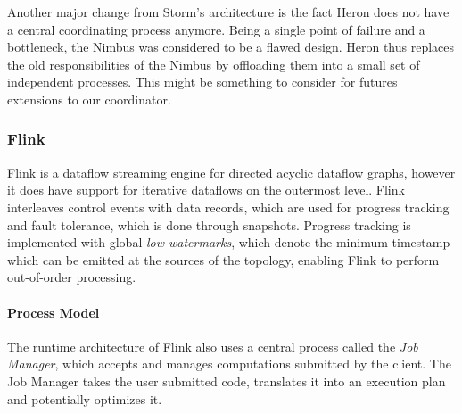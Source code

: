 Another major change from Storm's architecture
is the fact Heron does not have a central coordinating process anymore. Being
a single point of failure and a bottleneck, the Nimbus was considered to be a
flawed design. Heron thus replaces the old responsibilities of the Nimbus by
offloading them into a small set of independent processes. This might be something
to consider for futures extensions to our coordinator.

\subsubsection{Flink}

Flink \cite{flink} is a dataflow streaming engine for directed acyclic
dataflow graphs, however it does have support for iterative dataflows on the
outermost level. Flink interleaves control events with data records, which
are used for progress tracking and fault tolerance, which is done through
snapshots. Progress tracking is implemented with global \emph{low watermarks}, which
denote the minimum timestamp which can be emitted at the sources of the
topology, enabling Flink to perform out-of-order processing.

\paragraph{Process Model}

The runtime architecture of Flink also uses a central process called the
\emph{Job Manager}, which accepts and manages computations submitted by
the client. The Job Manager takes the user submitted code, translates it into
an execution plan and potentially optimizes it.

